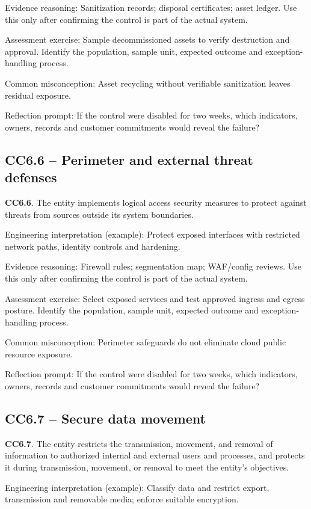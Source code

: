 \documentclass[10pt,oneside]{report}
\begin{document}
Evidence reasoning: Sanitization records; disposal certificates; asset ledger. Use this only after confirming the control is part of the actual system.

Assessment exercise: Sample decommissioned assets to verify destruction and approval. Identify the population, sample unit, expected outcome and exception-handling process.

Common misconception: Asset recycling without verifiable sanitization leaves residual exposure.

Reflection prompt: If the control were disabled for two weeks, which indicators, owners, records and customer commitments would reveal the failure?

\subsection{CC6.6 -- Perimeter and external threat defenses}
\begin{aicpabox}
\textbf{CC6.6}. The entity implements logical access security measures to protect against threats from sources outside its system boundaries.\par{}
\end{aicpabox}
Engineering interpretation (example): Protect exposed interfaces with restricted network paths, identity controls and hardening.

Evidence reasoning: Firewall rules; segmentation map; WAF/config reviews. Use this only after confirming the control is part of the actual system.

Assessment exercise: Select exposed services and test approved ingress and egress posture. Identify the population, sample unit, expected outcome and exception-handling process.

Common misconception: Perimeter safeguards do not eliminate cloud public resource exposure.

Reflection prompt: If the control were disabled for two weeks, which indicators, owners, records and customer commitments would reveal the failure?

\subsection{CC6.7 -- Secure data movement}
\begin{aicpabox}
\textbf{CC6.7}. The entity restricts the transmission, movement, and removal of information to authorized internal and external users and processes, and protects it during transmission, movement, or removal to meet the entity's objectives.\par{}
\end{aicpabox}
Engineering interpretation (example): Classify data and restrict export, transmission and removable media; enforce suitable encryption.
\end{document}
